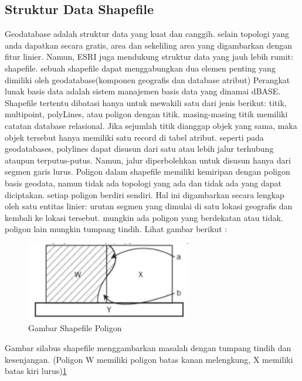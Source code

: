 \subsection{Struktur Data Shapefile}
Geodatabase adalah struktur data yang kuat dan canggih. selain topologi yang anda dapatkan secara gratis, area dan sekeliling area yang
digambarkan dengan fitur linier. Namun, ESRI juga mendukung struktur data yang jauh lebih rumit: shapefile. sebuah shapefile dapat menggabungkan dua elemen penting yang dimiliki oleh geodatabase(komponen geografis dan database atribut) Perangkat lunak 
basis data adalah sistem manajemen basis data yang dinamai dBASE. Shapefile tertentu dibatasi hanya untuk mewakili satu dari jenis berikut: titik, multipoint, polyLines, atau poligon dengan titik. masing-masing titik memiliki catatan database relasional. Jika sejumlah titik dianggap objek yang sama, maka objek tersebut hanya memiliki satu record di tabel atribut. seperti pada geodatabases, polylines dapat disusun dari satu atau lebih jalur terhubung ataupun terputus-putus. Namun, jalur diperbolehkan untuk disusun hanya dari segmen garis lurus. Poligon dalam shapefile memiliki kemiripan dengan poligon basis geodata, namun tidak ada topologi yang ada dan tidak ada yang dapat diciptakan. setiap poligon berdiri sendiri. Hal ini digambarkan secara lengkap oleh satu entitas linier: urutan segmen yang dimulai di satu lokasi geografis dan kembali ke lokasi tersebut. mungkin ada poligon yang berdekatan atau tidak. poligon lain mungkin tumpang tindih. Lihat gambar berikut :
\begin{figure} [ht]
	\centerline{\includegraphics[width=.5\textwidth]{figures/shapefilepoligon.JPG}}
	\caption{Gambar Shapefile Poligon}
	\label{shapefilepoligon}
	\end{figure}
Gambar silabus shapefile menggambarkan masalah dengan tumpang tindih dan kesenjangan. (Poligon W memiliki poligon batas kanan melengkung, X memiliki batas kiri lurus)\ref{shapefilepoligon}
